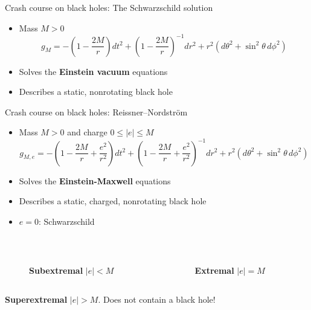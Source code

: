 \documentclass[compress,usenames,dvipsnames,8pt]{beamer}
\theoremstyle{definition}
\renewcommand{\(}{\begin{columns}}
\renewcommand{\)}{\end{columns}}
\newcommand{\<}[1]{\begin{column}{#1}}
\renewcommand{\>}{\end{column}}
\begin{document}
\begin{frame}{Crash course on black holes: The Schwarzschild solution}

\begin{itemize}
\item Mass $M>0$ 
\[g_M= -\left(1-\frac{2M}{r}\right)dt^2 +\left(1-\frac{2M}{r}\right)^{-1}dr^2 + r^2(d\theta^2+\sin^2\theta\,d\phi^2)\]
\item Solves the \textbf{Einstein vacuum} equations
\item Describes a static, nonrotating black hole
\end{itemize}
\begin{figure}
 \def\svgwidth{20pc}

\end{figure}

\addtocounter{framenumber}{-1}

\end{frame}

\begin{frame}{Crash course on black holes: Reissner--Nordstr\"om}

\begin{itemize}
\item Mass $M>0$ and charge $0\le |e|\le M$
\[g_{M,e}=-\left(1-\frac{2M}{r}+\frac{e^2}{r^2}\right)dt^2+\left(1-\frac{2M}{r}+\frac{e^2}{r^2}\right)^{-1}dr^2+r^2(d\theta^2+\sin^2\theta\,d\phi^2)\]

\item Solves the \textbf{Einstein-Maxwell} equations

\item Describes a static, charged, nonrotating black hole 

\item $e=0$: Schwarzschild 
\end{itemize}
\pause

~\\

\begin{columns}%
		\begin{column}{0.4\linewidth}
			\begin{figure}
 \def\svgwidth{10pc}

\caption{\textbf{Subextremal} $|e|<M$}
\end{figure}
		\end{column}
		\begin{column}{0.4\linewidth}
		\pause	\begin{figure}
 \def\svgwidth{10pc}

\caption{\textbf{Extremal} $|e|=M$}
\end{figure}
		\end{column}
	\end{columns}
	\pause
	\begin{center}
	\textbf{Superextremal} $|e|>M$. Does not contain a black hole!
	\end{center}

\end{frame}
\end{document}
